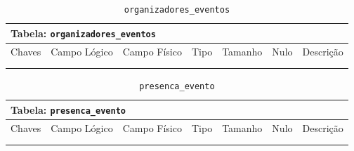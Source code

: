 \documentclass[12pt,a4paper]{article}
\begin{document}
\begin{center}
\begin{table}[h!]
	\caption{\texttt{organizadores\_eventos}}
	\label{tabela:organizadoresEventos}
	\begin{tabular}{|p{1cm}|p{1.5cm}|p{1.25cm}|p{1.25cm}|p{1.75cm}|p{1.25cm}|p{4.5cm}|}\hline	
		\multicolumn{7}{|p{16cm}|}{\cellcolor{cinzaClaro}  \centering Tabela: \texttt{organizadores\_eventos}} \\ \hline %
		{\small Chaves} & {\small Campo Lógico} & {\small Campo Físico} & {\small Tipo} & {\small Tamanho} & {\small Nulo} & {\small Descrição}\\\hline %
		
		{\tiny } & {\tiny } & {\tiny } & {\tiny } & {\tiny } & {\tiny } &{\tiny }\\\hline
		{\tiny } & {\tiny } & {\tiny } & {\tiny } & {\tiny } & {\tiny } &{\tiny }\\\hline
		
			
	\end{tabular}
\end{table}	
\end{center}


\begin{center}
\begin{table}[h!]
	\caption{\texttt{presenca\_evento}}
	\label{tabela:presencaEvento}
	\begin{tabular}{|p{1cm}|p{1.5cm}|p{1.25cm}|p{1.25cm}|p{1.75cm}|p{1.25cm}|p{4.5cm}|}\hline	
		\multicolumn{7}{|p{16cm}|}{\cellcolor{cinzaClaro}  \centering Tabela: \texttt{presenca\_evento}} \\ \hline %
		{\small Chaves} & {\small Campo Lógico} & {\small Campo Físico} & {\small Tipo} & {\small Tamanho} & {\small Nulo} & {\small Descrição}\\\hline %
		
		{\tiny } & {\tiny } & {\tiny } & {\tiny } & {\tiny } & {\tiny } &{\tiny }\\\hline
		{\tiny } & {\tiny } & {\tiny } & {\tiny } & {\tiny } & {\tiny } &{\tiny }\\\hline
		
			
	\end{tabular}
\end{table}	
\end{center}
\end{document}
